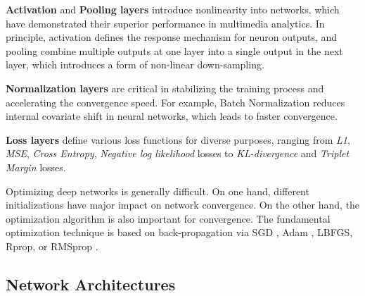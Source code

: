 \textbf{Activation} \cite{Han1995,Hahnloser2000DigitalSA,Nair:2010:RLU:3104322.3104425,Maas13rectifiernonlinearities,journals/corr/ClevertUH15} and \textbf{Pooling layers} \cite{NIPS2012_4824,Scherer:2010:EPO:1886436.1886447} introduce nonlinearity into networks, which have demonstrated their superior performance in multimedia analytics.
%
In principle, activation defines the response mechanism for neuron outputs, and pooling combine multiple outputs at one layer into a single output in the next layer, which introduces a form of non-linear down-sampling.


\textbf{Normalization layers} \cite{icml2015_ioffe15,Ulyanov2016InstanceNT} are critical in stabilizing the training process and accelerating the convergence speed. For example, Batch Normalization \cite{icml2015_ioffe15} reduces internal covariate shift in neural networks, which leads to faster convergence. 


\textbf{Loss layers} define various loss functions for diverse purposes, ranging from \emph{L1}, \emph{MSE}, \emph{Cross Entropy}, \emph{Negative log likelihood} losses to \emph{KL-divergence} and \emph{Triplet Margin} losses. 







Optimizing deep networks is generally difficult. On one hand, different initializations \cite{GlorotAISTATS2010,He:2015:DDR:2919332.2919814} have major impact on network convergence. On the other hand, the optimization algorithm is also important for convergence. The fundamental optimization technique is based on back-propagation \cite{Rumelhart:1988:LRB:65669.104451} via SGD \cite{Saad:1999:OLN:304710,Polyak:1992:ASA:131092.131098}, Adam \cite{Kingma2014AdamAM}, LBFGS, Rprop, or RMSprop \cite{journals/corr/Graves13}.



\subsection{Network Architectures}
\label{ssec:architecture}

